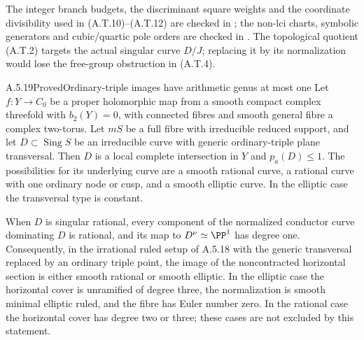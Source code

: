 The integer branch budgets, the discriminant square
weights and the coordinate divisibility used in
(A.T.10)--(A.T.12) are checked in
; the non-lci charts,
symbolic generators and cubic/quartic pole orders
are checked in .
The topological
quotient (A.T.2) targets the actual singular curve
$D/J$; replacing it by its normalization would
lose the free-group obstruction in (A.T.4).





\begin{statement}{A.5.19}{Proved}{Ordinary-triple images have arithmetic genus at most one}
Let $f:Y\to C_0$ be a proper holomorphic map from a smooth
compact complex threefold with $b_2(Y)=0$, with connected
fibres and smooth general fibre a complex two-torus.
Let $mS$ be a full fibre with irreducible reduced support,
and let $D\subset\operatorname{Sing}S$ be an irreducible
curve with generic ordinary-triple plane transversal.
Then $D$ is a local complete intersection in $Y$ and
$p_a(D)\le1$. The possibilities for its underlying curve
are a smooth rational curve, a rational curve with one
ordinary node or cusp, and a smooth elliptic curve.
In the elliptic case the transversal type is constant.

When $D$ is singular rational, every component of the
normalized conductor curve dominating $D$ is rational,
and its map to $D^\nu\simeq\PP^1$ has degree one.
Consequently, in the irrational ruled setup of A.5.18
with the generic transversal replaced by an ordinary
triple point, the image of the noncontracted horizontal
section is either smooth rational or smooth elliptic.
In the elliptic case the horizontal cover is unramified
of degree three, the normalization is smooth minimal
elliptic ruled, and the fibre has Euler number zero.
In the rational case the horizontal cover has degree
two or three; these cases are not excluded by this
statement.
\end{statement}
